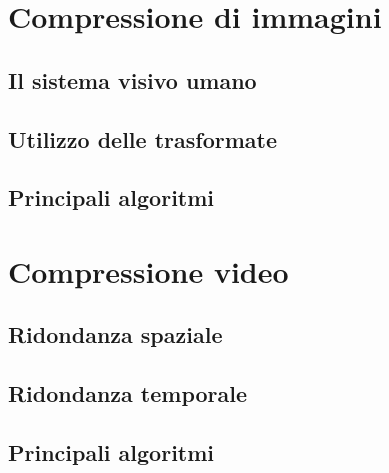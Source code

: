 
\section{Compressione di immagini}


\subsection{Il sistema visivo umano}


\subsection{Utilizzo delle trasformate}


\subsection{Principali algoritmi}


\section{Compressione video}


\subsection{Ridondanza spaziale}


\subsection{Ridondanza temporale}


\subsection{Principali algoritmi}

